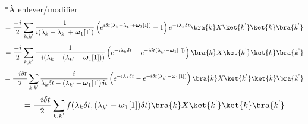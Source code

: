 *À enlever/modifier
\begin{equation*}
    = \frac{-i}{2}\sum_{k, k^\text{'}}\frac{1}{i(\lambda_k - \lambda_{k^\text{'}} + \boldsymbol{\omega}_1[1])}\left(e^{i\delta t(\lambda_k - \lambda_{k^\text{'}} + \boldsymbol{\omega}_1[1])} - 1\right)e^{-i\lambda_k\delta t} \bra{k}X\ket{k^\text{'}}\ket{k}\bra{k^\text{'}}
\end{equation*}
\begin{equation*}
    = \frac{-i}{2}\sum_{k, k^\text{'}}\frac{1}{-i(\lambda_k - (\lambda_{k^\text{'}} - \boldsymbol{\omega}_1[1]))}\left(e^{-i\lambda_k\delta t} - e^{-i\delta t(\lambda_{k^\text{'}} - \boldsymbol{\omega}_1[1])} \right) \bra{k}X\ket{k^\text{'}}\ket{k}\bra{k^\text{'}}
\end{equation*}
\begin{equation*}
    = \frac{-i\delta t}{2}\sum_{k, k^\text{'}}\frac{i}{\lambda_k\delta t - (\lambda_{k^\text{'}} - \boldsymbol{\omega}_1[1])\delta t}\left(e^{-i\lambda_k\delta t} - e^{-i\delta t(\lambda_{k^\text{'}} - \boldsymbol{\omega}_1[1])} \right) \bra{k}X\ket{k^\text{'}}\ket{k}\bra{k^\text{'}}
\end{equation*}
\begin{equation}
    = \frac{-i\delta t}{2}\sum_{k, k^\text{'}}f(\lambda_k\delta t, (\lambda_{k^\text{'}}-\boldsymbol{\omega}_1[1])\delta t)\bra{k}X\ket{k^\text{'}}\ket{k}\bra{k^\text{'}}
\end{equation}

